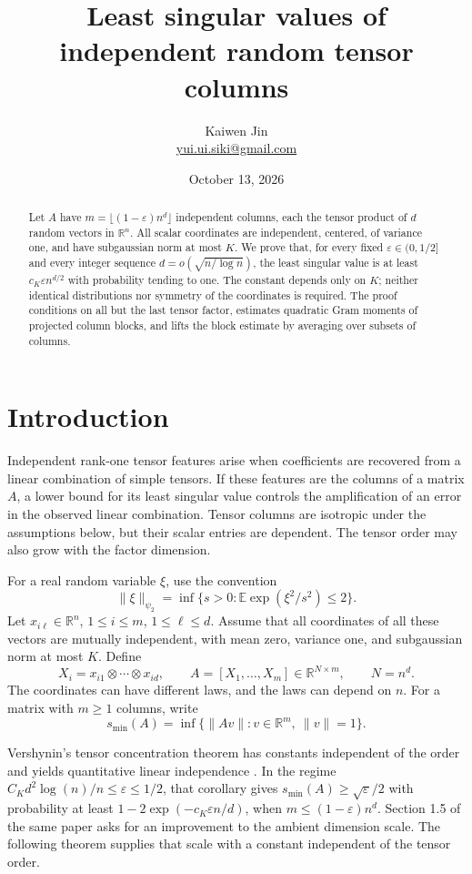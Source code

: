 \documentclass[11pt]{article}
\title{Least singular values of independent random tensor columns}
\author{Kaiwen Jin\\
\small\href{mailto:yui.ui.siki@gmail.com}{yui.ui.siki@gmail.com}}
\date{October 13, 2026}
\newcommand{\R}{\mathbb R}
\newcommand{\E}{\mathbb E}
\begin{document}
\maketitle

\begin{abstract}
Let \(A\) have \(m=\lfloor(1-\varepsilon)n^d\rfloor\) independent
columns, each the tensor product of \(d\) random vectors in \(\R^n\).
All scalar coordinates are independent, centered, of variance one,
and have subgaussian norm at most \(K\). We prove that, for every fixed
\(\varepsilon\in(0,1/2]\) and every integer sequence
\(d=o(\sqrt{n/\log n})\), the least singular value is at least
\(c_K\varepsilon n^{d/2}\) with probability tending to one.
The constant depends only on \(K\); neither identical distributions
nor symmetry of the coordinates is required. The proof conditions on
all but the last tensor factor, estimates quadratic Gram moments of
projected column blocks, and lifts the block estimate by averaging
over subsets of columns.
\end{abstract}

\section{Introduction}

Independent rank-one tensor features arise when coefficients are recovered
from a linear combination of simple tensors. If these features are the
columns of a matrix \(A\), a lower bound for its least singular value controls
the amplification of an error in the observed linear combination.
Tensor columns are isotropic under the assumptions below, but their scalar
entries are dependent. The tensor order may also grow with the factor
dimension.

For a real random variable \(\xi\), use the convention
\[
 \|\xi\|_{\psi_2}
 =\inf\{s>0:\E\exp(\xi^2/s^2)\le2\}.
\]
Let \(x_{i\ell}\in\R^n\), \(1\le i\le m\), \(1\le\ell\le d\).
Assume that all coordinates of all these vectors are mutually independent,
with mean zero, variance one, and subgaussian norm at most \(K\).
Define
\[
 X_i=x_{i1}\otimes\cdots\otimes x_{id},\qquad
 A=[X_1,\ldots,X_m]\in\R^{N\times m},\qquad N=n^d.
\]
The coordinates can have different laws, and the laws can depend on \(n\).
For a matrix with \(m\ge1\) columns, write
\[
 s_{\min}(A)=\inf\{\|Av\|:v\in\R^m,\ \|v\|=1\}.
\]

Vershynin's tensor concentration theorem has constants independent of
the order and yields quantitative linear independence
\cite[Theorem 1.4 and Corollary 6.2]{Vershynin}.
In the regime
\(C_Kd^2\log(n)/n\le\varepsilon\le1/2\), that corollary gives
\(s_{\min}(A)\ge\sqrt{\varepsilon}/2\) with probability at least
\(1-2\exp(-c_K\varepsilon n/d)\), when
\(m\le(1-\varepsilon)n^d\).
Section 1.5 of the same paper asks for an improvement to the ambient
dimension scale. The following theorem supplies that scale with a constant
independent of the tensor order.
\end{document}
